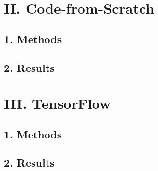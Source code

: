 \newpage
\section*{\Large II. Code-from-Scratch}

\subsection*{\large 1. Methods}

\subsection*{\large 2. Results}

\newpage
\section*{\Large III. TensorFlow}

\subsection*{\large 1. Methods}

\subsection*{\large 2. Results}






\clearpage

%
%
%



